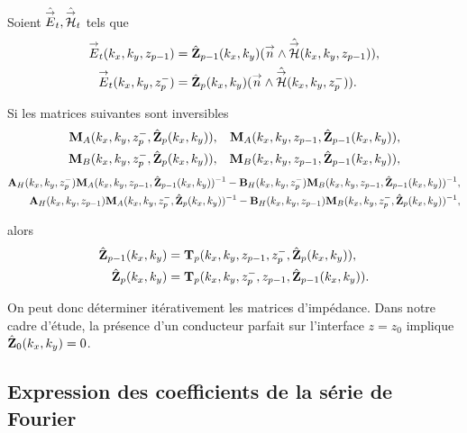     \begin{prop}%
      \label{prop:plan:synthese:impedance}{}~

      Soient \(\hat{{\overset{\rightarrow}{E}}}_t,\hat{{\overset{\rightarrow}{\mathcal{H}}}}_t\) tels que 
      \begin{align*}
      {\overset{\rightarrow}{E}}_t(k_x,k_y,z_{p-1}) &= \hat{\mathbf{Z}}_{p-1}(k_x,k_y)({\overset{\rightarrow}{n}} \wedge \hat{{\overset{\rightarrow}{\mathcal{H}}}}(k_x,k_y,z_{p-1})),
      \\
      {\overset{\rightarrow}{E}}_t(k_x,k_y,z_p^-) &= \hat{\mathbf{Z}}_{p}(k_x,k_y)({\overset{\rightarrow}{n}} \wedge \hat{{\overset{\rightarrow}{\mathcal{H}}}}(k_x,k_y,z_p^-)).
      \end{align*}

      Si les matrices suivantes sont inversibles
      \begin{align*}
        \mathbf{M}_{A}(k_x,k_y,z_p^-,\hat{\mathbf{Z}}_{p}(k_x,k_y)), && \mathbf{M}_{A}(k_x,k_y,z_{p-1},\hat{\mathbf{Z}}_{p-1}(k_x,k_y)),
        \\
        \mathbf{M}_{B}(k_x,k_y,z_p^-,\hat{\mathbf{Z}}_{p}(k_x,k_y)), && \mathbf{M}_{B}(k_x,k_y,z_{p-1},\hat{\mathbf{Z}}_{p-1}(k_x,k_y)),
      \end{align*}
      \begin{align*}
        \mathbf{A}_{H}(k_x,k_y,z_p^-)\mathbf{M}_{A}(k_x,k_y,z_{p-1},\hat{\mathbf{Z}}_{p-1}(k_x,k_y))^{-1} - \mathbf{B}_{H}(k_x,k_y,z_p^-)\mathbf{M}_{B}(k_x,k_y,z_{p-1},\hat{\mathbf{Z}}_{p-1}(k_x,k_y))^{-1},
        \\
        \mathbf{A}_{H}(k_x,k_y,z_{p-1})\mathbf{M}_{A}(k_x,k_y,z_p^-,\hat{\mathbf{Z}}_{p}(k_x,k_y))^{-1} - \mathbf{B}_{H}(k_x,k_y,z_{p-1})\mathbf{M}_{B}(k_x,k_y,z_p^-,\hat{\mathbf{Z}}_{p}(k_x,k_y))^{-1},
      \end{align*}

      alors 
      \begin{align*}
        \hat{\mathbf{Z}}_{p-1}(k_x,k_y) &= \mathbf{T}_p(k_x,k_y,z_{p-1},z_p^-,\hat{\mathbf{Z}}_{p}(k_x,k_y)),
        \\
        \hat{\mathbf{Z}}_{p}(k_x,k_y) &= \mathbf{T}_p(k_x,k_y,z_p^-,z_{p-1},\hat{\mathbf{Z}}_{p-1}(k_x,k_y)).
      \end{align*}

    \end{prop}

    On peut donc déterminer itérativement les matrices d'impédance. Dans notre cadre d'étude, la présence d'un conducteur parfait sur l'interface \(z= z_0\) implique \(\hat{\mathbf{Z}}_{0}(k_x,k_y) = 0\).


\subsection{Expression des coefficients de la série de Fourier}

